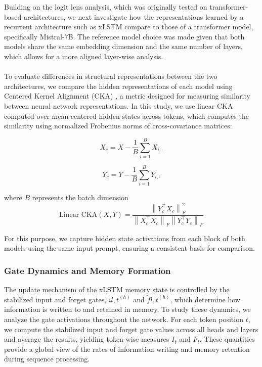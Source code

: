 Building on the logit lens analysis, which was originally tested on transformer-based architectures,
we next investigate how the representations learned by a recurrent architecture such as xLSTM compare 
to those of a transformer model, specifically Mistral-7B. The reference model choice was made given that
both models share the same embedding dimension and the same number of layers, which 
allows for a more aligned layer-wise analysis. \\ \\
%
To evaluate differences in structural representations between the two architectures, we compare the 
hidden representations of each model using Centered Kernel Alignment (CKA) 
\cite{kornblith2019similarityneuralnetworkrepresentations},
a metric designed for measuring similarity between neural network representations. 
In this study, we use linear CKA computed over mean-centered hidden states across tokens, 
which computes the similarity using normalized Frobenius norms of cross-covariance matrices:

\begin{equation}
X_c = X - \frac{1}{B} \sum_{i=1}^{B} X_{i, \cdot}
\end{equation}

\begin{equation}
Y_c = Y - \frac{1}{B} \sum_{i=1}^{B} Y_{i, \cdot}
\end{equation}

where $B$ represents the batch dimension
\begin{equation}
\text{Linear CKA}(X, Y) = \frac{\left\| Y_c^\top X_c \right\|_F^2}{\left\| X_c^\top X_c \right\|_F \left\| Y_c^\top Y_c \right\|_F}
\label{eq:linear_cka}
\end{equation}

\noindent For this purpose, we capture hidden state activations from each block of both models using the 
same input prompt, ensuring a consistent basis for comparison.

\subsubsection{Gate Dynamics and Memory Formation}

The update mechanism of the xLSTM memory state is controlled by the stabilized input and forget gates, $\tilde{i}{l,t}^{(h)}$ and $\tilde{f}{l,t}^{(h)}$,
which determine how information is written to and retained in memory. To study these dynamics, 
we analyze the gate activations throughout the network. For each token position $t$, we compute
the stabilized input and forget gate values across all heads and layers and average the results, 
yielding token-wise measures $I_t$ and $F_t$. These quantities provide a global 
view of the rates of information writing and memory retention during sequence processing.

